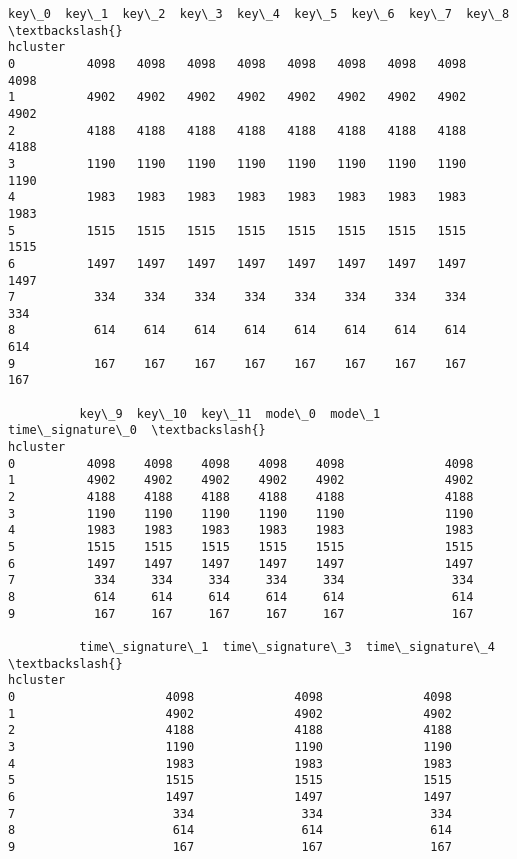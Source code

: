 \documentclass[11pt]{article}
\makeatletter
\newcommand{\boxspacing}{\kern\kvtcb@left@rule\kern\kvtcb@boxsep}
\newcommand{\prompt}[4]{
        {\ttfamily\llap{{\color{#2}[#3]:\hspace{3pt}#4}}\vspace{-\baselineskip}}
    }
\makeatother
\begin{document}
            \begin{tcolorbox}[breakable, size=fbox, boxrule=.5pt, pad at break*=1mm, opacityfill=0]
\prompt{Out}{outcolor}{180}{\boxspacing}
\begin{Verbatim}[commandchars=\\\{\}]
          key\_0  key\_1  key\_2  key\_3  key\_4  key\_5  key\_6  key\_7  key\_8  \textbackslash{}
hcluster
0          4098   4098   4098   4098   4098   4098   4098   4098   4098
1          4902   4902   4902   4902   4902   4902   4902   4902   4902
2          4188   4188   4188   4188   4188   4188   4188   4188   4188
3          1190   1190   1190   1190   1190   1190   1190   1190   1190
4          1983   1983   1983   1983   1983   1983   1983   1983   1983
5          1515   1515   1515   1515   1515   1515   1515   1515   1515
6          1497   1497   1497   1497   1497   1497   1497   1497   1497
7           334    334    334    334    334    334    334    334    334
8           614    614    614    614    614    614    614    614    614
9           167    167    167    167    167    167    167    167    167

          key\_9  key\_10  key\_11  mode\_0  mode\_1  time\_signature\_0  \textbackslash{}
hcluster
0          4098    4098    4098    4098    4098              4098
1          4902    4902    4902    4902    4902              4902
2          4188    4188    4188    4188    4188              4188
3          1190    1190    1190    1190    1190              1190
4          1983    1983    1983    1983    1983              1983
5          1515    1515    1515    1515    1515              1515
6          1497    1497    1497    1497    1497              1497
7           334     334     334     334     334               334
8           614     614     614     614     614               614
9           167     167     167     167     167               167

          time\_signature\_1  time\_signature\_3  time\_signature\_4  \textbackslash{}
hcluster
0                     4098              4098              4098
1                     4902              4902              4902
2                     4188              4188              4188
3                     1190              1190              1190
4                     1983              1983              1983
5                     1515              1515              1515
6                     1497              1497              1497
7                      334               334               334
8                      614               614               614
9                      167               167               167


\end{Verbatim}
\end{tcolorbox}
\end{document}
